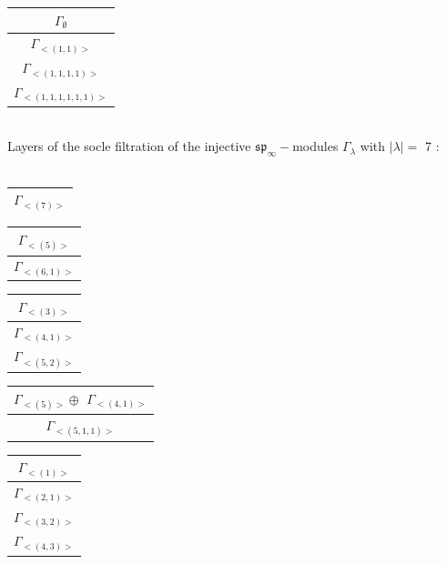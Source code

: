 \begin{minipage}{.2\textwidth}
\centering
\begin{tabular}{|c|}\hline
$\Gamma_\emptyset$
\\ \hline
$\Gamma_{<(
1 , 
1
)>}$
\\ \hline
$\Gamma_{<(
1 , 
1 , 
1 , 
1
)>}$
\\ \hline
$\Gamma_{<(
1 , 
1 , 
1 , 
1 , 
1 , 
1
)>}$
\\
\hline\end{tabular}\end{minipage}
\\




\bigskip
Layers of the socle filtration of the injective $\mathfrak{sp}_\infty-$modules $\Gamma_{\lambda}$ with $|\lambda| = $ 7 : \\\\
\begin{minipage}{.2\textwidth}
\centering
\begin{tabular}{|c|}\hline
$\Gamma_{<(
7
)>}$
\\
\hline\end{tabular}\end{minipage}
\begin{minipage}{.2\textwidth}
\centering
\begin{tabular}{|c|}\hline
$\Gamma_{<(
5
)>}$
\\ \hline
$\Gamma_{<(
6 , 
1
)>}$
\\
\hline\end{tabular}\end{minipage}
\begin{minipage}{.2\textwidth}
\centering
\begin{tabular}{|c|}\hline
$\Gamma_{<(
3
)>}$
\\ \hline
$\Gamma_{<(
4 , 
1
)>}$
\\ \hline
$\Gamma_{<(
5 , 
2
)>}$
\\
\hline\end{tabular}\end{minipage}
\begin{minipage}{.2\textwidth}
\centering
\begin{tabular}{|c|}\hline
$\Gamma_{<(
5
)>} \oplus$
$\Gamma_{<(
4 , 
1
)>}$
\\ \hline
$\Gamma_{<(
5 , 
1 , 
1
)>}$
\\
\hline\end{tabular}\end{minipage}
\begin{minipage}{.2\textwidth}
\centering
\begin{tabular}{|c|}\hline
$\Gamma_{<(
1
)>}$
\\ \hline
$\Gamma_{<(
2 , 
1
)>}$
\\ \hline
$\Gamma_{<(
3 , 
2
)>}$
\\ \hline
$\Gamma_{<(
4 , 
3
)>}$
\\
\hline\end{tabular}\end{minipage}

